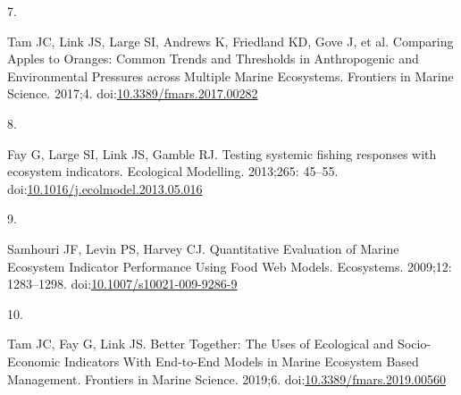 \documentclass[
]{article}
\newlength{\cslhangindent}
\newlength{\csllabelwidth}
\newenvironment{CSLReferences}[2] %
 {\begin{list}{}{%
  \setlength{\itemindent}{0pt}
  \setlength{\leftmargin}{0pt}
  \setlength{\parsep}{0pt}
  \ifodd #1
   \setlength{\leftmargin}{\cslhangindent}
   \setlength{\itemindent}{-1\cslhangindent}
  \fi
  \setlength{\itemsep}{#2\baselineskip}}}
 {\end{list}}
\newcommand{\CSLLeftMargin}[1]{\parbox[t]{\csllabelwidth}{\strut#1\strut}}
\newcommand{\CSLRightInline}[1]{\parbox[t]{\linewidth - \csllabelwidth}{\strut#1\strut}}
\begin{document}
\begin{CSLReferences}{0}{1}
\CSLLeftMargin{7. }%
\CSLRightInline{Tam JC, Link JS, Large SI, Andrews K, Friedland KD, Gove J, et al. Comparing {Apples} to {Oranges}: {Common} {Trends} and {Thresholds} in {Anthropogenic} and {Environmental} {Pressures} across {Multiple} {Marine} {Ecosystems}. Frontiers in Marine Science. 2017;4. doi:\href{https://doi.org/10.3389/fmars.2017.00282}{10.3389/fmars.2017.00282}}

\CSLLeftMargin{8. }%
\CSLRightInline{Fay G, Large SI, Link JS, Gamble RJ. Testing systemic fishing responses with ecosystem indicators. Ecological Modelling. 2013;265: 45--55. doi:\href{https://doi.org/10.1016/j.ecolmodel.2013.05.016}{10.1016/j.ecolmodel.2013.05.016}}

\CSLLeftMargin{9. }%
\CSLRightInline{Samhouri JF, Levin PS, Harvey CJ. Quantitative {Evaluation} of {Marine} {Ecosystem} {Indicator} {Performance} {Using} {Food} {Web} {Models}. Ecosystems. 2009;12: 1283--1298. doi:\href{https://doi.org/10.1007/s10021-009-9286-9}{10.1007/s10021-009-9286-9}}

\CSLLeftMargin{10. }%
\CSLRightInline{Tam JC, Fay G, Link JS. Better {Together}: {The} {Uses} of {Ecological} and {Socio}-{Economic} {Indicators} {With} {End}-to-{End} {Models} in {Marine} {Ecosystem} {Based} {Management}. Frontiers in Marine Science. 2019;6. doi:\href{https://doi.org/10.3389/fmars.2019.00560}{10.3389/fmars.2019.00560}}

\end{CSLReferences}
\end{document}
